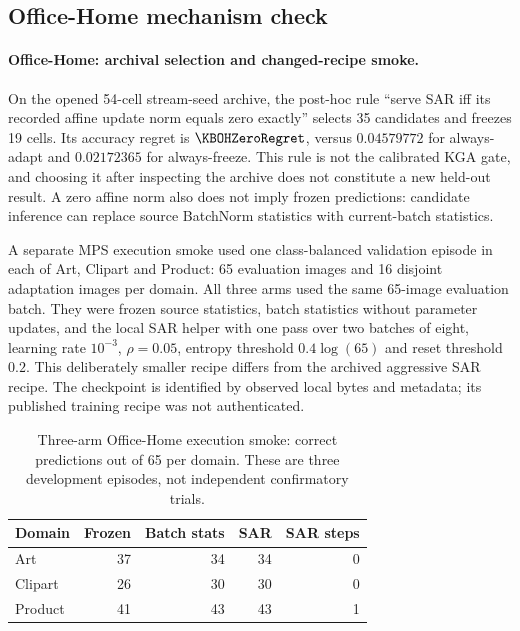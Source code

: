 \subsection{Office-Home mechanism check}
\label{app:opened-recipe-smoke}

\paragraph{Office-Home: archival selection and changed-recipe smoke.}
On the opened 54-cell stream-seed archive, the post-hoc rule ``serve SAR iff its
recorded affine update norm equals zero exactly'' selects 35 candidates and freezes
19 cells. Its accuracy regret is $\KBOHZeroRegret$, versus $0.04579772$ for
always-adapt and $0.02172365$ for always-freeze. This rule is not the calibrated
KGA gate, and choosing it after inspecting the archive does not constitute a
new held-out result. A zero affine norm also does not imply frozen predictions:
candidate inference can replace source BatchNorm statistics with current-batch statistics.

A separate MPS execution smoke used one class-balanced validation episode in each
of Art, Clipart and Product: 65 evaluation images and 16 disjoint adaptation images
per domain. All three arms used the same 65-image evaluation batch. They were
frozen source statistics, batch statistics without parameter updates, and the local
SAR helper with one pass over two batches of eight, learning rate $10^{-3}$,
$\rho=0.05$, entropy threshold $0.4\log(65)$ and reset threshold $0.2$.
This deliberately smaller recipe differs from the archived aggressive SAR recipe.
The checkpoint is identified by observed local bytes and metadata; its published
training recipe was not authenticated.

\begin{table}[htbp]
\centering\small
\caption{Three-arm Office-Home execution smoke: correct predictions out of 65 per
domain. These are three development episodes, not independent confirmatory trials.}
\label{tab:officehome-three-arm-smoke}
\begin{tabular}{@{}lrrrr@{}}
\toprule
Domain & Frozen & Batch stats & SAR & SAR steps \\
\midrule
Art & 37 & 34 & 34 & 0 \\
Clipart & 26 & 30 & 30 & 0 \\
Product & 41 & 43 & 43 & 1 \\
\bottomrule
\end{tabular}
\end{table}


